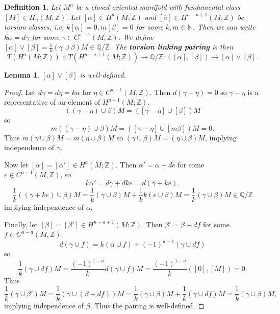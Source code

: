 \documentclass{article}
\newtheorem{definition}[theorem]{Definition}
\newtheorem{lemma}[theorem]{Lemma}
\begin{document}
\begin{definition}
Let $M^n$ be a closed oriented manifold with fundamental class $[M]\in H_n(M;\mathbb{Z})$. Let $[\alpha]\in H^a(M;\mathbb{Z})$ and $[\beta]\in H^{n-a+1}(M;\mathbb{Z})$ be torsion classes, i.e. $k[\alpha]=0,m[\beta]=0$ for some $k,m\in\mathbb{N}$. Then we can write $k\alpha=d\gamma$ for some $\gamma\in C^{a-1}(M,\mathbb{Z})$. We define $[\alpha]\vee[\beta]=\frac{1}{k}(\gamma\cup\beta)M\in\mathbb{Q}/\mathbb{Z}$. The \textbf{torsion linking pairing} is then \[T(H^a(M;\mathbb{Z}))\times T(H^{n-a+1}(M;\mathbb{Z}))\to\mathbb{Q}/\mathbb{Z}:([\alpha],[\beta])\mapsto[\alpha]\vee[\beta].\]
\end{definition}
\begin{lemma}
$[\alpha]\vee[\beta]$ is well-defined.
\end{lemma}
\begin{proof}
Let $d\gamma=d\eta=k\alpha$ for $\eta\in C^{a-1}(M,\mathbb{Z})$. Then $d(\gamma-\eta)=0$ so $\gamma-\eta$ is a representative of an element of $H^{a-1}(M;\mathbb{Z})$. \[((\gamma-\eta)\cup\beta)M=([\gamma-\eta]\cup[\beta])M\] so \[m((\gamma-\eta)\cup\beta)M=([\gamma-\eta]\cup[m\beta])M=0.\] Thus $m(\gamma\cup\beta)M=m(\eta\cup\beta)M$ so $(\gamma\cup\beta)M=(\eta\cup\beta)M$, implying independence of $\gamma$.

\noindent Now let $[\alpha]=[\alpha']\in H^a(M;\mathbb{Z})$. Then $\alpha'=\alpha+de$ for some $e\in C^{a-1}(M,\mathbb{Z})$, so \[k\alpha'=d\gamma+dke=d(\gamma+ke).\] \[\frac{1}{k}((\gamma+ke)\cup\beta)M=\frac{1}{k}(\gamma\cup\beta)M+\frac{1}{k}k(e\cup\beta)M=\frac{1}{k}(\gamma\cup\beta)M \in \mathbb{Q}/\mathbb{Z}\] implying independence of $\alpha$.

\noindent Finally, let $[\beta]=[\beta']\in H^{n-a+1}(M;\mathbb{Z})$. Then $\beta'=\beta+df$ for some $f\in C^{n-a}(M,\mathbb{Z})$. \[d(\gamma\cup f)=k(\alpha\cup f)+(-1)^{a-1}(\gamma\cup df)\] so \[\frac{1}{k}(\gamma\cup df)M=\frac{(-1)^{1-a}}{k}d(\gamma\cup f)M=\frac{(-1)^{1-a}}{k}([0],[M])=0.\] Thus \[\frac{1}{k}(\gamma\cup\beta')M=\frac{1}{k}(\gamma\cup(\beta+df))M=\frac{1}{k}(\gamma\cup\beta)M+\frac{1}{k}(\gamma\cup df)M=\frac{1}{k}(\gamma\cup\beta)M,\] implying independence of $\beta$. Thus the pairing is well-defined.
\end{proof}
\end{document}
